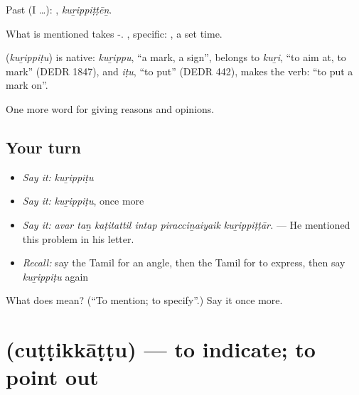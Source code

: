 Past (I …): , \emph{kuṟippiṭṭēṉ}.

What is mentioned takes -. , specific:  , a set time.

\begin{cousinweb}
\textbf{} (\emph{kuṟippiṭu}) is native: \emph{kuṟippu}, \textquotedblleft{}a mark, a sign\textquotedblright{}, belongs to \emph{kuṟi}, \textquotedblleft{}to aim at, to mark\textquotedblright{} (DEDR 1847), and \emph{iṭu}, \textquotedblleft{}to put\textquotedblright{} (DEDR 442), makes the verb: \textquotedblleft{}to put a mark on\textquotedblright{}.
\end{cousinweb}

\begin{grammarlens}[title={What you've built}]
One more word for giving reasons and opinions.
\end{grammarlens}

\subsection*{Your turn}
\begin{itemize}
\raggedright
  \item \emph{Say it:} \emph{kuṟippiṭu}
  \item \emph{Say it:} \emph{kuṟippiṭu}, once more
  \item \emph{Say it:} \emph{avar taṉ kaṭitattil intap piracciṉaiyaik kuṟippiṭṭār.} — He mentioned this problem in his letter.
  \item \emph{Recall:} say the Tamil for an angle, then the Tamil for to express, then say \emph{kuṟippiṭu} again
\end{itemize}

\begin{tcolorbox}[breakable,colback=teal!4,colframe=teal!35!black,title={Before you move on}]
What does  mean? (\textquotedblleft{}To mention; to specify\textquotedblright{}.) Say it once more.
\end{tcolorbox}
\section[\texorpdfstring{\ta{சுட்டிக்காட்டு} (cuṭṭikkāṭṭu)}{சுட்டிக்காட்டு (cuṭṭikkāṭṭu)}]{ (cuṭṭikkāṭṭu) — to indicate; to point out}

\label{lesson:TA-C351-cuttikkattu}



